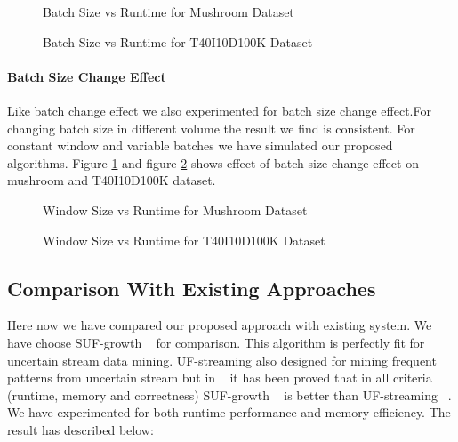 \documentclass[conference]{IEEEtran}
\begin{document}
        \begin{figure}[h]
        \centering
            
        \caption{Batch Size vs Runtime for Mushroom Dataset }
        \label{result:g_m_const_batch}
        \end{figure}
        \begin{figure}[h]
        \centering
            
        \caption{Batch Size vs Runtime for T40I10D100K Dataset }
        \label{result:g_t10_const_batch}
        \end{figure}
         
\paragraph{Batch Size Change Effect}Like batch change effect we also experimented for batch size change effect.For changing batch size in different volume the result we find is consistent. For constant window and variable batches we have simulated our proposed algorithms. Figure-\ref{result:g_m_const_batch} and figure-\ref{result:g_t10_const_batch} shows effect of batch size change effect on mushroom and T40I10D100K dataset.
        \begin{figure}[h]
        \centering
            
        \caption{Window Size vs Runtime for Mushroom Dataset }
        \label{result:g_m_const_win}
        \end{figure}
        \begin{figure}[h]
        \centering
            
        \caption{Window Size vs Runtime for T40I10D100K Dataset }
        \label{result:g_t10_const_win}
        \end{figure}
        
\subsection{Comparison With Existing Approaches}
Here now we have compared our proposed approach with existing system. We have choose SUF-growth ~\cite{suf_growth}  for comparison. This algorithm is perfectly fit for uncertain stream data mining. UF-streaming also designed for mining frequent patterns from uncertain stream but in ~\cite{suf_growth} it has been proved that in all criteria (runtime, memory and correctness) SUF-growth ~\cite{suf_growth} is better than UF-streaming ~\cite{suf_growth}. We have experimented for both runtime performance and memory efficiency. The result has described below:
\end{document}
